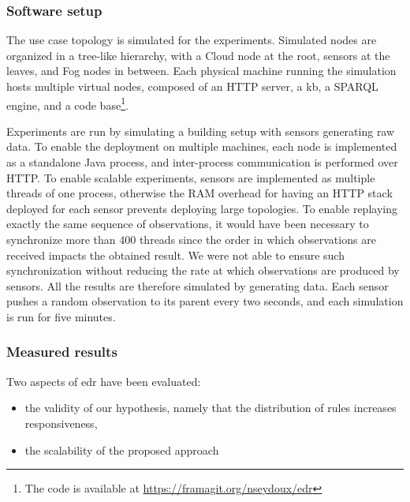 \documentclass[sw]{iosart2x}
\begin{document}
\subsubsection{Software setup}

The use case topology is simulated for the experiments.
Simulated nodes are organized in a tree-like hierarchy, with a Cloud node at the root, sensors at the leaves, and Fog nodes in between.
Each physical machine running the simulation hosts multiple virtual nodes, composed of an HTTP server, a \gls{kb}, a SPARQL engine, and a code base\footnote{The code is available at \url{https://framagit.org/nseydoux/edr}}.

Experiments are run by simulating a building setup with sensors generating raw data. 
To enable the deployment on multiple machines, each node is implemented as a standalone Java process, and inter-process communication is performed over HTTP. 
To enable scalable experiments, sensors are implemented as multiple threads of one process, otherwise the RAM overhead for having an HTTP stack deployed for each sensor prevents deploying large topologies.
To enable replaying exactly the same sequence of observations, it would have been necessary to synchronize more than 400 threads since the order in which observations are received impacts the obtained result. 
We were not able to ensure such synchronization without reducing the rate at which observations are produced by sensors.
All the results are therefore simulated by generating data.
Each sensor pushes a random observation to its parent every two seconds, and each simulation is run for five minutes.

\subsubsection{Measured results}

Two aspects of \gls{edr} have been evaluated:
\begin{itemize}
	\item the validity of our hypothesis, namely that the distribution of rules increases responsiveness,
	\item the scalability of the proposed approach
\end{itemize} 
\end{document}
